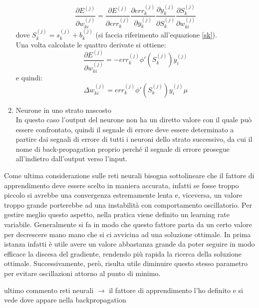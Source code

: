 \begin{enumerate}
	\begin{equation}
	\frac{\partial E^{(j)} }{\partial w_{ki}^{(j)}} = \frac{\partial E^{(j)}}{\partial err_k^{(j)}}
	\frac{\partial err_k^{(j)}}{\partial y_k^{(j)}}
	\frac{\partial y_k^{(j)}}{\partial S_k^{(j)}}
	\frac{\partial S_k^{(j)}}{\partial w_{ki}^{(j)}}
	\end{equation}
	dove $S_k^{(j)} = s_k^{(j)} + b_k^{(j)} $ (si faccia riferimento all'equazione \eqref{sk}). \\
	Una volta calcolate le quattro derivate si ottiene:
	\begin{equation}
	\frac{\partial E^{(j)} }{\partial w_{ki}^{(j)}} =
	-err_k^{(j)}\phi'(S_k^{(j)})y_i^{(j)}
	\end{equation}
	e quindi:
	\begin{equation}
	\Delta w_{ki}^{(j)} = err_k^{(j)}\phi'(S_k^{(j)})y_i^{(j)} \mu
	\end{equation}
	
	\item Neurone in uno strato nascosto \\
	In questo caso l'output del neurone non ha un diretto valore con il quale può essere confrontato, quindi il segnale di errore deve essere determinato a partire dai segnali di errore di tutti i neuroni dello strato successivo, da cui il nome di back-propagation proprio perché il segnale di errore prosegue all'indietro dall'output verso l'input.
\end{enumerate}
Come ultima considerazione sulle reti neurali bisogna sottolineare che il fattore di apprendimento deve essere scelto in maniera accurata, infatti se fosse troppo piccolo si avrebbe una convergenza estremamente lenta e, viceversa, un valore troppo grande porterebbe ad una instabilità con comportamento oscillatorio. Per gestire meglio questo aspetto, nella pratica viene definito un learning rate variabile. Generalmente si fa in modo che questo fattore parta da un certo valore per decrescere mano mano che si ci avvicina ad una soluzione ottimale. In prima istanza infatti è utile avere un valore abbastanza grande da poter seguire in modo efficace la discesa del gradiente, rendendo più rapida la ricerca della soluzione ottimale. Successivamente, però, risulta utile diminuire questo stesso parametro per evitare oscillazioni attorno al punto di minimo.

\color{red}
ultimo commento reti neurali $\rightarrow$ il fattore di apprendimento l'ho definito e si vede dove appare nella backpropagation \\
\color{black}

